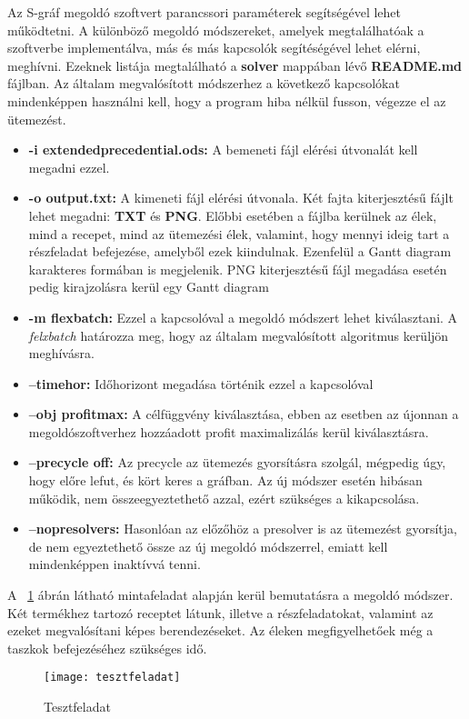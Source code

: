 Az S-gráf megoldó szoftvert parancssori paraméterek segítségével lehet működtetni. A különböző megoldó módszereket, amelyek megtalálhatóak a szoftverbe implementálva, más és más kapcsolók segítéségével lehet elérni, meghívni. Ezeknek listája megtalálható a \textbf{solver} mappában lévő \textbf{README.md} fájlban. Az általam megvalósított módszerhez a következő kapcsolókat mindenképpen használni kell, hogy a program hiba nélkül fusson, végezze el az ütemezést.
\begin{itemize}
	\item \textbf{-i extended\textunderscore precedential.ods:} A bemeneti fájl elérési útvonalát kell megadni ezzel.
	\item \textbf{-o output.txt:} A kimeneti fájl elérési útvonala. Két fajta kiterjesztésű fájlt lehet megadni: \textbf{TXT} és \textbf{PNG}. Előbbi esetében a fájlba kerülnek az élek, mind a recepet, mind az ütemezési élek, valamint, hogy mennyi ideig tart a részfeladat befejezése, amelyből ezek kiindulnak. Ezenfelül a Gantt diagram karakteres formában is megjelenik. PNG kiterjesztésű fájl megadása esetén pedig kirajzolásra kerül egy Gantt diagram
	\item \textbf{-m flexbatch:} Ezzel a kapcsolóval a megoldó módszert lehet kiválasztani. A \textit{felxbatch} határozza meg, hogy az általam megvalósított algoritmus kerüljön meghívásra.
	\item \textbf{--timehor:} Időhorizont megadása történik ezzel a kapcsolóval
	\item \textbf{--obj profit\textunderscore max:} A célfüggvény kiválasztása, ebben az esetben az újonnan a megoldószoftverhez hozzáadott profit maximalizálás kerül kiválasztásra.
	\item \textbf{--precycle off:} Az precycle az ütemezés gyorsításra szolgál, mégpedig úgy, hogy előre lefut, és kört keres a gráfban. Az új módszer esetén hibásan működik, nem összeegyeztethető azzal, ezért szükséges a kikapcsolása.
	\item \textbf{--nopresolvers:} Hasonlóan az előzőhöz a presolver is az ütemezést gyorsítja, de nem egyeztethető össze az új megoldó módszerrel, emiatt kell mindenképpen inaktívvá tenni.
\end{itemize}

A ~\ref{teszFeladat} ábrán látható mintafeladat alapján kerül bemutatásra a megoldó módszer. Két termékhez tartozó receptet látunk, illetve a részfeladatokat, valamint az ezeket megvalósítani képes berendezéseket. Az éleken megfigyelhetőek még a taszkok befejezéséhez szükséges idő.
\begin{figure}[H]
\begin{center}
\texttt{[image: tesztfeladat]}
\caption{Tesztfeladat}
\label{teszFeladat}
\end{center}
\end{figure}

